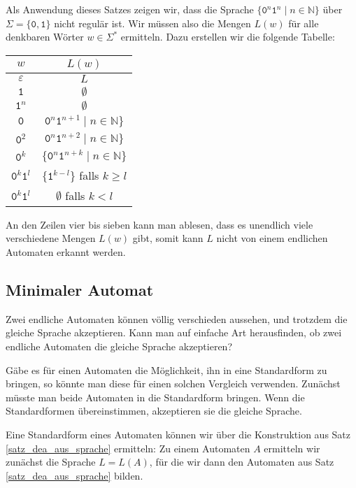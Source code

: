 Als Anwendung dieses Satzes zeigen wir, dass die Sprache
$\{ \texttt{0}^n\texttt{1}^n \;|\; n\in\mathbb N\}$ über
$\Sigma=\{\texttt{0},\texttt{1}\}$
nicht regulär ist.
Wir müssen also die Mengen $L(w)$ für alle denkbaren Wörter $w\in\Sigma^*$
ermitteln.
Dazu erstellen wir die folgende Tabelle:
\begin{center}
\begin{tabular}{|c|c|}
\hline
$w$&$L(w)$\\
\hline
$\varepsilon$&$L$\\
$\texttt{1}$&$\emptyset$\\
$\texttt{1}^n$&$\emptyset$\\
$\texttt{0}$&$\texttt{0}^n\texttt{1}^{n+1}\;|\; n\in\mathbb N\}$\\
$\texttt{0}^2$&$\texttt{0}^n\texttt{1}^{n+2}\;|\; n\in\mathbb N\}$\\
$\texttt{0}^k$&$\{\texttt{0}^n\texttt{1}^{n+k}\;|\; n\in\mathbb N\}$\\
$\texttt{0}^k\texttt{1}^l$&$\{\texttt{1}^{k-l}\}$ falls $k\ge l$\\
$\texttt{0}^k\texttt{1}^l$&$\emptyset $ falls $k<l$\\
\hline
\end{tabular}
\end{center}
An den Zeilen vier bis sieben kann man ablesen, dass es unendlich
viele verschiedene Mengen $L(w)$ gibt, somit kann $L$ nicht von
einem endlichen Automaten erkannt werden.

\subsection{Minimaler Automat\label{regulaer:minimalautomat}}
Zwei endliche Automaten können völlig verschieden aussehen,
und trotzdem die gleiche Sprache akzeptieren.
Kann man auf einfache
Art herausfinden, ob zwei endliche Automaten die gleiche Sprache
akzeptieren?

Gäbe es für einen Automaten die Möglichkeit, ihn in eine Standardform
zu bringen, so könnte man diese für einen solchen Vergleich verwenden.
Zunächst müsste man beide Automaten in die Standardform bringen.
Wenn die Standardformen übereinstimmen, akzeptieren sie die gleiche Sprache.

Eine Standardform eines Automaten können wir über die Konstruktion
aus Satz \ref{satz_dea_aus_sprache} ermitteln: Zu einem Automaten
$A$ ermitteln wir zunächst die Sprache $L=L(A)$, für die wir dann
den Automaten aus Satz \ref{satz_dea_aus_sprache} bilden.

